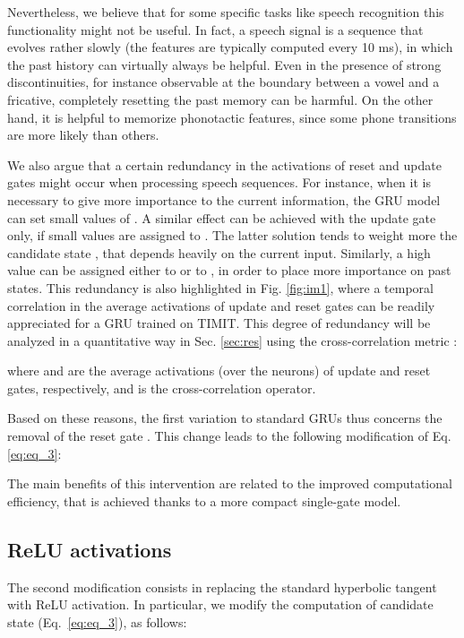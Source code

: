 \documentclass[journal]{IEEEtran}
\begin{document}
Nevertheless, we believe that for some specific tasks like speech recognition this functionality might not be useful. 
In fact, a speech signal is a sequence that evolves rather slowly (the features are typically computed every 10 ms), in which the past history can virtually always be helpful.  
Even in the presence of strong discontinuities, for instance observable at the boundary between a vowel and a fricative, completely resetting the past memory can be harmful. On the other hand, it is helpful to memorize phonotactic features, since some phone transitions are more likely than others.

We also argue that a certain redundancy in the activations of reset and update gates might occur when processing speech sequences.  For instance, when it is necessary to give more importance to the current information,  the GRU model can set small values of . A similar effect can be achieved with the update gate only, if small values are assigned to . The latter solution tends to weight more the candidate state , that depends heavily on the current input. 
Similarly, 
a high value can be assigned either to  or to , in order to place more importance on past states. 
This redundancy is also highlighted in Fig. \ref{fig:im1}, where a temporal correlation in the average activations of update and reset gates 
can be readily appreciated for a GRU trained on TIMIT. This degree of redundancy will be analyzed in a quantitative way in Sec. \ref{sec:res} using the cross-correlation metric :

where  and  are the average activations (over the neurons) of update and reset gates, respectively, and  is the cross-correlation operator.

Based on these reasons, the first variation to standard GRUs thus concerns the removal of the reset gate . This change leads to the following modification of Eq. \ref{eq:eq_3}:



The main benefits of this intervention are related to the improved computational efficiency, that is achieved thanks to a more compact single-gate model.



\subsection{ReLU activations}
The second modification consists in replacing the standard hyperbolic tangent with ReLU activation. In particular, we modify the computation of candidate state  (Eq.~\ref{eq:eq_3}), as follows:
\end{document}
